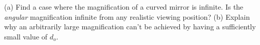 (a) Find a case where the magnification of a curved
mirror is infinite. Is the \emph{angular} magnification
infinite from any realistic viewing position? (b) Explain
why an arbitrarily large magnification can't be achieved by
having a sufficiently small value of $d_o$.
